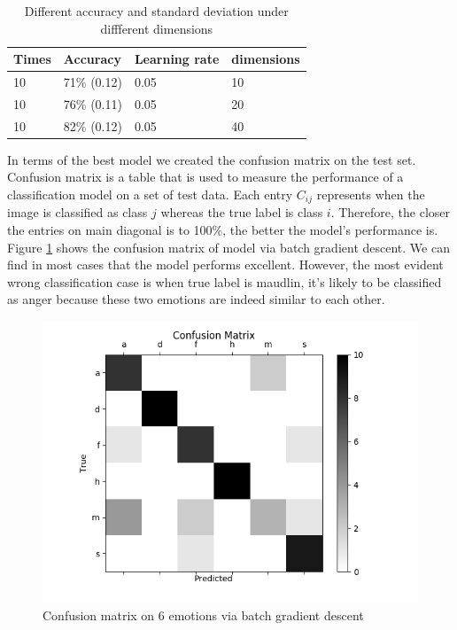 \documentclass{article}
\begin{document}
\begin{table}
  \caption{Different accuracy and standard deviation under diffferent dimensions}
  \label{table: softmax_bgd}
  \centering
  \begin{tabular}{llll}
    \toprule
    \cmidrule(r){1-4}
    Times     &Accuracy&Learning rate&dimensions \\
    \midrule
    10  &71\% (0.12)&0.05&10\\
    10  &76\% (0.11)&0.05&20\\
    10  &82\% (0.12)&0.05&40\\
    \bottomrule
  \end{tabular}
\end{table}
\par
In terms of the best model we created the confusion matrix on the test set. Confusion matrix is a table that is used to measure the performance of a classification model on a set of test data. Each entry $C_{ij}$ represents when the image is classified as class $j$ whereas the true label is class $i$. Therefore, the closer the entries on main diagonal is to 100\%, the better the model's performance is. Figure \ref{figure: confusion_bgd} shows the confusion matrix of model via batch gradient descent. We can find in most cases that the model performs excellent. However, the most evident wrong classification case is when true label is maudlin, it's likely to be classified as anger because these two emotions are indeed similar to each other.
\begin{figure}[ht]
\begin{center}
\includegraphics[scale=0.5]{images/confusion_bgd.png}
\end{center}
\caption{Confusion matrix on 6 emotions via batch gradient descent}
\label{figure: confusion_bgd}
\end{figure}
\end{document}
